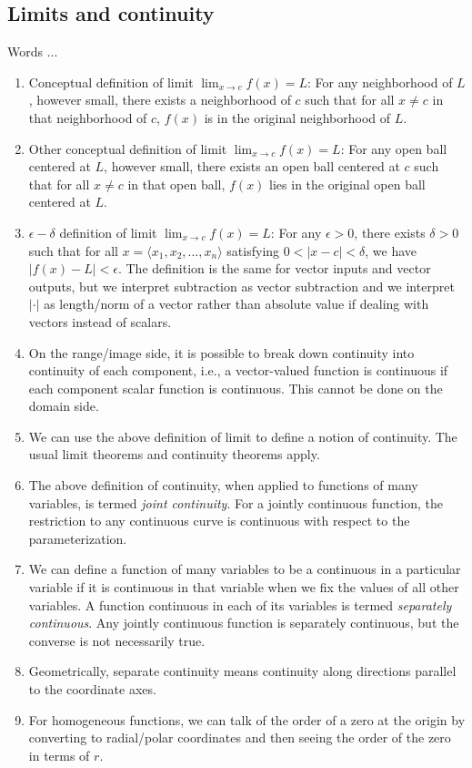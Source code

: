 \documentclass[10pt]{amsart}
\begin{document}
\subsection{Limits and continuity}

Words ...

\begin{enumerate}
\item Conceptual definition of limit $\lim_{x \to c} f(x) = L$: For
  any neighborhood of $L$, however small, there exists a neighborhood
  of $c$ such that for all $x \ne c$ in that neighborhood of $c$,
  $f(x)$ is in the original neighborhood of $L$.
\item Other conceptual definition of limit $\lim_{x \to c} f(x) = L$:
  For any open ball centered at $L$, however small, there exists an
  open ball centered at $c$ such that for all $x \ne c$ in that open
  ball, $f(x)$ lies in the original open ball centered at $L$.
\item $\epsilon-\delta$ definition of limit $\lim_{x \to c} f(x) = L$:
  For any $\epsilon > 0$, there exists $\delta > 0$ such that for all
  $x = \langle x_1,x_2,\dots,x_n \rangle$ satisfying $0 < |x - c| <
  \delta$, we have $|f(x) - L| < \epsilon$. The definition is the same
  for vector inputs and vector outputs, but we interpret subtraction
  as vector subtraction and we interpret $| \cdot |$ as length/norm of
  a vector rather than absolute value if dealing with vectors instead
  of scalars.
\item On the range/image side, it is possible to break down continuity
  into continuity of each component, i.e., a vector-valued function is
  continuous if each component scalar function is continuous. This
  cannot be done on the domain side.
\item We can use the above definition of limit to define a notion of
  continuity. The usual limit theorems and continuity theorems apply.
\item The above definition of continuity, when applied to functions of
  many variables, is termed {\em joint continuity}. For a jointly
  continuous function, the restriction to any continuous curve is
  continuous with respect to the parameterization.
\item We can define a function of many variables to be a continuous in
  a particular variable if it is continuous in that variable when we
  fix the values of all other variables. A function continuous in each
  of its variables is termed {\em separately continuous}. Any jointly
  continuous function is separately continuous, but the converse is
  not necessarily true.
\item Geometrically, separate continuity means continuity along
  directions parallel to the coordinate axes.
\item For homogeneous functions, we can talk of the order of a zero at
  the origin by converting to radial/polar coordinates and then seeing
  the order of the zero in terms of $r$.
\end{enumerate}
\end{document}
